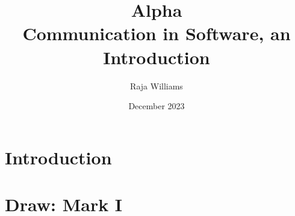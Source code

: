\documentclass{book}
\title{%
    Alpha \\
    \large Communication in Software, an Introduction
}
\author{Raja Williams}
\date{December 2023}
\begin{document}
\maketitle

\tableofcontents

\chapter{Introduction}


\chapter{Draw: Mark I}

\end{document}
